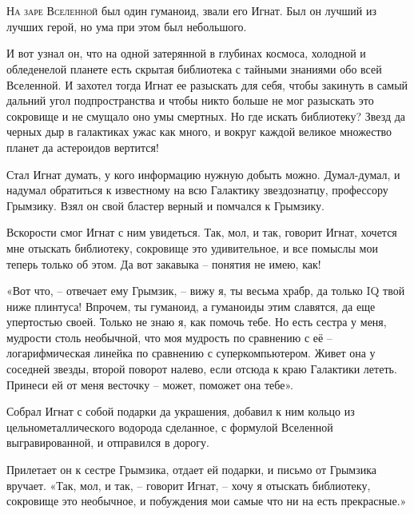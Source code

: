\documentclass[ebook,oneside,final,openright]{memoir}
\begin{document}
\chapter{}
 \lettrine{Н}{а заре Вселенной} был один гуманоид, звали его Игнат. Был он лучший из лучших герой, но ума при этом был небольшого.\par
\par
И вот узнал он, что на одной затерянной в глубинах космоса, холодной и обледенелой планете есть скрытая библиотека с тайными знаниями обо всей Вселенной. И захотел тогда Игнат ее разыскать для себя, чтобы закинуть в самый дальний угол подпространства и чтобы никто больше не мог разыскать это сокровище и не смущало оно умы смертных. Но где искать библиотеку? Звезд да черных дыр в галактиках ужас как много, и вокруг каждой великое множество планет да астероидов вертится!\par
\par
Стал Игнат думать, у кого информацию нужную добыть можно. Думал-думал, и надумал обратиться к известному на всю Галактику звездознатцу, профессору Грымзику. Взял он свой бластер верный и помчался к Грымзику.\par
\par
Вскорости смог Игнат с ним увидеться. Так, мол, и так, говорит Игнат, хочется мне отыскать библиотеку, сокровище это удивительное, и все помыслы мои теперь только об этом. Да вот закавыка – понятия не имею, как!\par
\par
«Вот что, – отвечает ему Грымзик, – вижу я, ты весьма храбр, да только IQ твой ниже плинтуса! Впрочем, ты гуманоид, а гуманоиды этим славятся, да еще упертостью своей. Только не знаю я, как помочь тебе. Но есть сестра у меня, мудрости столь необычной, что моя мудрость по сравнению с её – логарифмическая линейка по сравнению с суперкомпьютером. Живет она у соседней звезды, второй поворот налево, если отсюда к краю Галактики лететь. Принеси ей от меня весточку – может, поможет она тебе».\par
\par
Собрал Игнат с собой подарки да украшения, добавил к ним кольцо из цельнометаллического водорода сделанное, с формулой Вселенной выгравированной, и отправился в дорогу.\par
\par
Прилетает он к сестре Грымзика, отдает ей подарки, и письмо от Грымзика вручает. «Так, мол, и так, – говорит Игнат, – хочу я отыскать библиотеку, сокровище это необычное, и побуждения мои самые что ни на есть прекрасные.»\par
\end{document}
